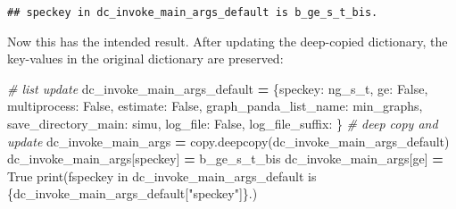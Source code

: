 \documentclass[
]{book}
\newenvironment{Shaded}{\begin{snugshade}}{\end{snugshade}}
\newcommand{\BuiltInTok}[1]{#1}
\newcommand{\CommentTok}[1]{\textcolor[rgb]{0.56,0.35,0.01}{\textit{#1}}}
\newcommand{\NormalTok}[1]{#1}
\newcommand{\OperatorTok}[1]{\textcolor[rgb]{0.81,0.36,0.00}{\textbf{#1}}}
\newcommand{\SpecialCharTok}[1]{\textcolor[rgb]{0.00,0.00,0.00}{#1}}
\newcommand{\SpecialStringTok}[1]{\textcolor[rgb]{0.31,0.60,0.02}{#1}}
\newcommand{\StringTok}[1]{\textcolor[rgb]{0.31,0.60,0.02}{#1}}
\newcommand{\VariableTok}[1]{\textcolor[rgb]{0.00,0.00,0.00}{#1}}
\begin{document}
\begin{verbatim}
## speckey in dc_invoke_main_args_default is b_ge_s_t_bis.
\end{verbatim}

Now this has the intended result. After updating the deep-copied dictionary, the key-values in the original dictionary are preserved:

\begin{Shaded}
\begin{Highlighting}[]
\CommentTok{\# list update}
\NormalTok{dc\_invoke\_main\_args\_default }\OperatorTok{=}\NormalTok{ \{}\StringTok{\textquotesingle{}speckey\textquotesingle{}}\NormalTok{: }\StringTok{\textquotesingle{}ng\_s\_t\textquotesingle{}}\NormalTok{,}
                               \StringTok{\textquotesingle{}ge\textquotesingle{}}\NormalTok{: }\VariableTok{False}\NormalTok{,}
                               \StringTok{\textquotesingle{}multiprocess\textquotesingle{}}\NormalTok{: }\VariableTok{False}\NormalTok{,}
                               \StringTok{\textquotesingle{}estimate\textquotesingle{}}\NormalTok{: }\VariableTok{False}\NormalTok{,}
                               \StringTok{\textquotesingle{}graph\_panda\_list\_name\textquotesingle{}}\NormalTok{: }\StringTok{\textquotesingle{}min\_graphs\textquotesingle{}}\NormalTok{,}
                               \StringTok{\textquotesingle{}save\_directory\_main\textquotesingle{}}\NormalTok{: }\StringTok{\textquotesingle{}simu\textquotesingle{}}\NormalTok{,}
                               \StringTok{\textquotesingle{}log\_file\textquotesingle{}}\NormalTok{: }\VariableTok{False}\NormalTok{,}
                               \StringTok{\textquotesingle{}log\_file\_suffix\textquotesingle{}}\NormalTok{: }\StringTok{\textquotesingle{}\textquotesingle{}}\NormalTok{\}}
\CommentTok{\# deep copy and update}
\NormalTok{dc\_invoke\_main\_args }\OperatorTok{=}\NormalTok{ copy.deepcopy(dc\_invoke\_main\_args\_default)}
\NormalTok{dc\_invoke\_main\_args[}\StringTok{\textquotesingle{}speckey\textquotesingle{}}\NormalTok{] }\OperatorTok{=} \StringTok{\textquotesingle{}b\_ge\_s\_t\_bis\textquotesingle{}}
\NormalTok{dc\_invoke\_main\_args[}\StringTok{\textquotesingle{}ge\textquotesingle{}}\NormalTok{] }\OperatorTok{=} \VariableTok{True}
\BuiltInTok{print}\NormalTok{(}\SpecialStringTok{f\textquotesingle{}speckey in dc\_invoke\_main\_args\_default is }\SpecialCharTok{\{}\NormalTok{dc\_invoke\_main\_args\_default[}\StringTok{"speckey"}\NormalTok{]}\SpecialCharTok{\}}\SpecialStringTok{.\textquotesingle{}}\NormalTok{)}
\end{Highlighting}
\end{Shaded}
\end{document}
